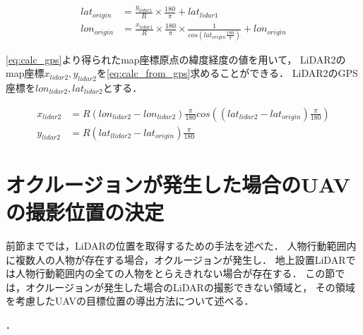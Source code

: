 \documentclass[autodetect-engine,dvipdfmx-if-dvi,ja=standard,a4j,jbase=11pt,magstyle=nomag*]{bxjsreport}
\begin{document}
\begin{equation}
    \begin{aligned}
        lat_{origin} &= \frac{y_{lidar1}}{R} \times \frac{180}{\pi} + lat_{lidar1}\\
        lon_{origin} &= \frac{x_{lidar1}}{R} \times \frac{180}{\pi} \times \frac{1}{cos( lat_{origin} \frac{180}{\pi})} + lon_{origin}
    \end{aligned}
    \label{eq:calc_gps}
\end{equation}

\cref{eq:calc_gps}より得られたmap座標原点の緯度経度の値を用いて，
LiDAR2のmap座標$x_{lidar2}, y_{lidar2}$を\cref{eq:calc_from_gps}求めることができる．
LiDAR2のGPS座標を$lon_{lidar2}, lat_{lidar2}$とする．

\begin{equation}
    \begin{aligned}
        x_{lidar2} &=  R ( lon_{lidar2} - lon_{lidar2} ) \frac{\pi}{180} cos(( lat_{lidar2} - lat_{origin} )\frac{\pi}{180}) \\
        y_{lidar2} &=  R ( lat_{llidar2} - lat_{origin} ) \frac{\pi}{180}
    \end{aligned}
    \label{eq:calc_from_gps}
\end{equation}

\section{オクルージョンが発生した場合のUAVの撮影位置の決定}
前節まででは，LiDARの位置を取得するための手法を述べた．
人物行動範囲内に複数人の人物が存在する場合，オクルージョンが発生し．
地上設置LiDARでは人物行動範囲内の全ての人物をとらえきれない場合が存在する．
この節では，オクルージョンが発生した場合のLiDARの撮影できない領域と，
その領域を考慮したUAVの目標位置の導出方法について述べる．

 
       ．
\end{document}
